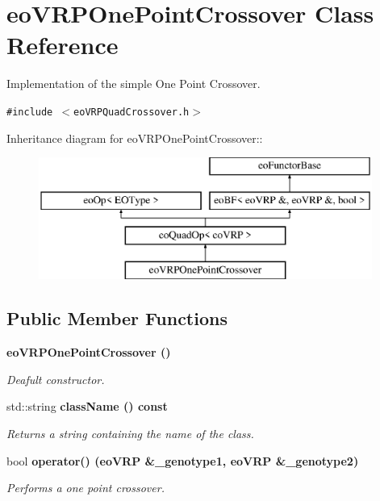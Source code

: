 \section{eo\-VRPOne\-Point\-Crossover Class Reference}
\label{classeo_v_r_p_one_point_crossover}
Implementation of the simple One Point Crossover.  


{\tt \#include $<$eo\-VRPQuad\-Crossover.h$>$}

Inheritance diagram for eo\-VRPOne\-Point\-Crossover::\begin{figure}[H]
\begin{center}
\leavevmode
\includegraphics[height=4cm]{classeo_v_r_p_one_point_crossover}
\end{center}
\end{figure}
\subsection*{Public Member Functions}
\begin{CompactItemize}
\item 
\bf{eo\-VRPOne\-Point\-Crossover} ()\label{classeo_v_r_p_one_point_crossover_24f40efc1adb60947c5d533653bbfbe9}

\begin{CompactList}\small\item\em Deafult constructor. \item\end{CompactList}\item 
std::string \bf{class\-Name} () const 
\begin{CompactList}\small\item\em Returns a string containing the name of the class. \item\end{CompactList}\item 
bool \bf{operator()} (\bf{eo\-VRP} \&\_\-genotype1, \bf{eo\-VRP} \&\_\-genotype2)
\begin{CompactList}\small\item\em Performs a one point crossover. \item\end{CompactList}\end{CompactItemize}


